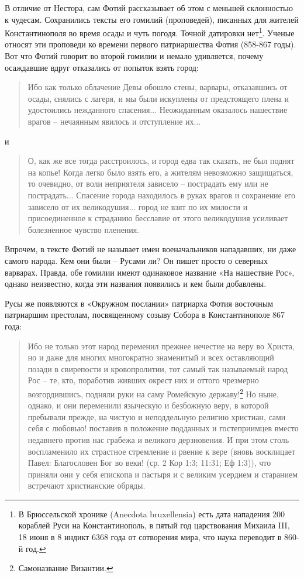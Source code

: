В отличие от Нестора, сам Фотий рассказывает об этом с меньшей склонностью к чудесам. Сохранились тексты его гомилий (проповедей), писанных для жителей Константинополя во время осады и чуть погодя. Точной датировки нет\footnote{В Брюссельской хронике (Anecdota bruxellensia) есть дата нападения 200 кораблей Руси на Константинополь, в пятый год царствования Михаила III, 18 июня в 8 индикт 6368 года от сотворения мира, что наука переводит в 860-й год.}. Ученые относят эти проповеди ко времени первого патриаршества Фотия (858-867 годы). Вот что Фотий говорит во второй гомилии и немало удивляется, почему осаждавшие вдруг отказались от попыток взять город\cite[часть 2, стр. 430–443]{fotiy01}:

\begin{quotation}
Ибо как только облачение Девы обошло стены, варвары, отказавшись от осады, снялись с лагеря, и мы были искуплены от предстоящего плена и удостоились нежданного спасения... Неожиданным оказалось нашествие врагов – нечаянным явилось и отступление их...
\end{quotation}

и

\begin{quotation}
О, как же все тогда расстроилось, и город едва так сказать, не был поднят на копье! Когда легко было взять его, а жителям невозможно защищаться, то очевидно, от воли неприятеля зависело – пострадать ему или не пострадать... Спасение города находилось в руках врагов и сохранение его зависело от их великодушия... город не взят по их милости и присоединенное к страданию бесславие от этого великодушия усиливает болезненное чувство пленения.
\end{quotation}

Впрочем, в тексте Фотий не называет имен военачальников нападавших, ни даже самого народа. Кем они были – Русами ли? Он пишет просто о северных варварах. Правда, обе гомилии имеют одинаковое название «На нашествие Рос», однако неизвестно, когда эти названия появились и кем были добавлены.

Русы же появляются в «Окружном послании» патриарха Фотия восточным патриаршим престолам, посвященному созыву Собора в Константинополе 867 года:

\begin{quotation}
Ибо не только этот народ переменил прежнее нечестие на веру во Христа, но и даже для многих многократно знаменитый и всех оставляющий позади в свирепости и кровопролитии, тот самый так называемый народ Рос – те, кто, поработив живших окрест них и оттого чрезмерно возгордившись, подняли руки на саму Ромейскую державу!\footnote{Самоназвание Византии.} Но ныне, однако, и они переменили языческую и безбожную веру, в которой пребывали прежде, на чистую и неподдельную религию христиан, сами себя с любовью! поставив в положение подданных и гостеприимцев вместо недавнего против нас грабежа и великого дерзновения. И при этом столь воспламенило их страстное стремление и рвение к вере (вновь восклицает Павел: Благословен Бог во веки! (ср. 2 Кор 1:3; 11:31; Еф 1:3)), что приняли они у себя епископа и пастыря и с великим усердием и старанием встречают христианские обряды.
\end{quotation}

